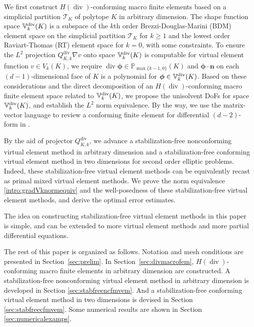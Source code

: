 \documentclass[10pt]{amsart}
\renewcommand{\div}{\operatorname{div}}
\numberwithin{equation}{section}
\begin{document}
We first construct $H(\div)$-conforming macro finite elements based on a simplicial partition $\mathcal T_K$ of polytope $K$ in arbitrary dimension. The shape function space $\mathbb{V}_{k}^{\rm div}(K)$ is a subspace of the $k$th order Brezzi-Douglas-Marini (BDM) element space on the simplicial partition $\mathcal T_K$ for $k\geq1$ and the lowest order Raviart-Thomas (RT) element space for $k=0$, with some constraints. To ensure the $L^2$ projection $Q_{K,k}^{\div}\nabla v$ onto space $\mathbb{V}_{k}^{\rm div}(K)$ is computable for virtual element function $v\in V_k(K)$, we require $\div\boldsymbol{\phi}\in\mathbb P_{\max\{k-1,0\}}(K)$ and $\boldsymbol{\phi}\cdot\boldsymbol{n}$ on each $(d-1)$-dimensional face of $K$ is a polynomial for $\boldsymbol{\phi}\in\mathbb{V}_{k}^{\rm div}(K)$.  
Based on these considerations and the direct decomposition of an $H(\div)$-conforming macro finite element space related to $\mathbb{V}_{k}^{\rm div}(K)$, we propose the unisolvent DoFs for space $\mathbb{V}_{k}^{\rm div}(K)$, and establish the $L^2$ norm equivalence.
By the way, we use the matrix-vector language to review a conforming finite element for differential $(d-2)$-form in \cite{ArnoldFalkWinther2006,Arnold2018}. 









By the aid of projector $Q_{K,k}^{\div}$, we advance a stabilization-free nonconforming virtual element method in arbitrary dimension and a stabilization-free conforming virtual element method in two dimensions  for second order elliptic problems.
Indeed, these stabilization-free virtual element methods can be equivalently recast as
primal mixed virtual element methods.
We prove the norm equivalence \eqref{intro:gradVknormequiv} and the well-posedness of these stabilization-free virtual element methods, and derive the optimal error estimates.

The idea on constructing stabilization-free virtual element methods in this paper is simple,
and can be extended to more virtual element methods and more partial differential equations.


The rest of this paper is organized as follows. Notation and mesh conditions are presented in Section~\ref{sec:prelim}. 
In Section~\ref{sec:divmacrofem}, $H(\div)$-conforming macro finite elements in arbitrary dimension are constructed. A stabilization-free nonconforming virtual element method in arbitrary dimension is developed in Section \ref{sec:stabfreencfmvem}. And a stabilization-free conforming virtual element method in two dimensions is devised in Section \ref{sec:stabfreecfmvem}.
Some numerical results are shown in Section \ref{sec:numericalexamps}.
\end{document}

